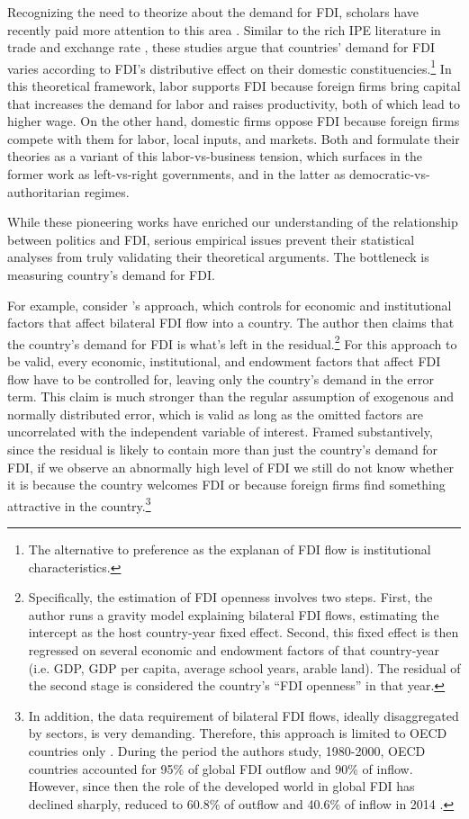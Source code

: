 Recognizing the need to theorize about the demand for FDI, scholars have recently paid more attention to this area \citep{Pinto2013, Pandya2016}. Similar to the rich IPE literature in trade and exchange rate \citep{Broz2001, Milner2005a}, these studies argue that countries' demand for FDI varies according to FDI's distributive effect on their domestic constituencies.\footnote{The alternative to preference as the explanan of FDI flow is institutional characteristics.} In this theoretical framework, labor supports FDI because foreign firms bring capital that increases the demand for labor and raises productivity, both of which lead to higher wage. On the other hand, domestic firms oppose FDI because foreign firms compete with them for labor, local inputs, and markets. Both \citet{Pinto2013} and \citet{Pandya2016} formulate their theories as a variant of this labor-vs-business tension, which surfaces in the former work as left-vs-right governments, and in the latter as democratic-vs-authoritarian regimes.

While these pioneering works have enriched our understanding of the relationship between politics and FDI, serious empirical issues prevent their statistical analyses from truly validating their theoretical arguments. The bottleneck is measuring country's demand for FDI.

For example, consider \citet{Pinto2008, Pinto2013}'s approach, which controls for economic and institutional factors that affect bilateral FDI flow into a country. The author then claims that the country's demand for FDI is what's left in the residual.\footnote{Specifically, the estimation of FDI openness involves two steps. First, the author runs a gravity model explaining bilateral FDI flows, estimating the intercept as the host country-year fixed effect. Second, this fixed effect is then regressed on several economic and endowment factors of that country-year (i.e. GDP, GDP per capita, average school years, arable land). The residual of the second stage is considered the country's ``FDI openness'' in that year.} For this approach to be valid, every economic, institutional, and endowment factors that affect FDI flow have to be controlled for, leaving only the country's demand in the error term. This claim is much stronger than the regular assumption of exogenous and normally distributed error, which is valid as long as the omitted factors are uncorrelated with the independent variable of interest. Framed substantively, since the residual is likely to contain more than just the country's demand for FDI, if we observe an abnormally high level of FDI we still do not know whether it is because the country welcomes FDI or because foreign firms find something attractive in the country.\footnote{In addition, the data requirement of bilateral FDI flows, ideally disaggregated by sectors, is very demanding. Therefore, this approach is limited to OECD countries only \citep{Pinto2008}. During the period the authors study, 1980-2000, OECD countries accounted for 95\% of global FDI outflow and 90\% of inflow. However, since then the role of the developed world in global FDI has declined sharply, reduced to 60.8\% of outflow and 40.6\% of inflow in 2014 \citep{UNCTAD2015}.}


